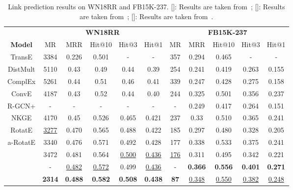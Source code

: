 \documentclass{article}
\begin{document}
\begin{table}[t]
\small
\centering
\caption{Link prediction results on WN18RR and FB15K-237. []: Results are taken from~\citep{nguyen2017novel}; []: Results are taken from~\citep{dettmers2018convolutional}; []: Results are taken from~\citep{sun2019rotate}.}

\begin{tabular}{ccccccccccc}
\toprule
               & \multicolumn{5}{c}{\textbf{WN18RR}}   & \multicolumn{5}{c}{\textbf{FB15K-237}} \\
             \textbf{Model}  & MR  & MRR   & Hit@10 & Hit@3 & Hit@1 & MR & MRR   & Hit@10 & Hit@3 & Hit@1 \\ \midrule
TransE           &  3384  & 0.226 & 0.501  & -& -&   357& 0.294  &  0.465  & - & - \\ DistMult       & 5110 & 0.43 &   0.49    &  0.44    & 0.39 & 254 &  0.241& 0.419 & 0.263 & 0.155 \\
ComplEx        & 5261   & 0.44 &   0.51& 0.46 &0.41  & 339  &  0.247&   0.428&  0.275& 0.158 \\
ConvE         & 4187 &0.43  & 0.52  &  0.44& 0.40 & 244  & 0.325  & 0.501   & 0.356 & 0.237 \\
R-GCN+         & - & - & -  &-  & - & - &0.249  &0.417   & 0.264 & 0.151 \\
NKGE &  4170  & 0.45 & 0.526  & 0.465 &  0.421& 237 & 0.33  & 0.510 & 0.365 &0.241\\
RotatE       & \underline{3277} & 0.470 & 0.565  & 0.488 & 0.422 & 185 & 0.297 &  0.480 &  0.328&  0.205\\

a-RotatE & 3340 & 0.476 & 0.571  & 0.492 & 0.428 & 177 & 0.338 &  0.533 &  0.375& 0.241\\

\midrule
 & 3472 & 0.481 & 0.564  & \underline{0.500} & \underline{0.436}  & \underline{176}  & 0.311 & 0.495  & 0.342 & 0.221 \\
 & - & \underline{0.482}& \underline{0.572}  & 0.499 & \underline{0.436} & - & \textbf{0.366} & \textbf{0.556} & \textbf{0.401} &\textbf{0.271 } \\

 & \textbf{2314} &  \textbf{ 0.488}  &   \textbf{ 0.582 } &  \textbf{ 0.508} &   \textbf{0.438}   &   \textbf{87} & \underline{ 0.348}  &   \underline{ 0.550 }&   \underline{0.382}   &    \underline{  0.248} \\ \bottomrule
\end{tabular}
\vspace{-1em}
\label{table:new}
\end{table}
\end{document}
